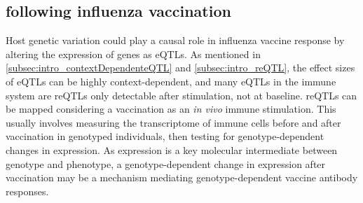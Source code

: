 
\subsection{ following influenza vaccination}

Host genetic variation could play a causal role in influenza vaccine response by altering the expression of genes as \glspl{eQTL}.
As mentioned in \cref{subsec:intro_contextDependenteQTL} and \cref{subsec:intro_reQTL}, the effect sizes of \glspl{eQTL} can be highly context-dependent,
and many \glspl{eQTL} in the immune system are \glspl{reQTL} only detectable after stimulation, not at baseline.
\Glspl{reQTL} can be mapped considering a vaccination as an \textit{in vivo} immune stimulation.
This usually involves measuring the transcriptome of immune cells before and after vaccination in genotyped individuals,
then testing for genotype-dependent changes in expression.
As expression is a key molecular intermediate between genotype and phenotype,
a genotype-dependent change in expression after vaccination may be a mechanism mediating genotype-dependent vaccine antibody responses.

